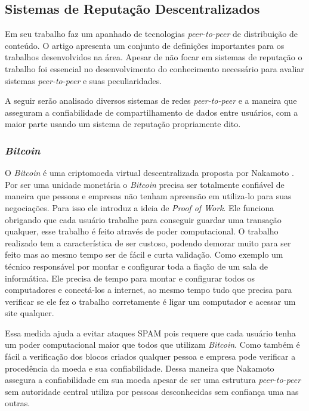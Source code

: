 \documentclass[12pt]{article}
\newcommand{\PtoP} {\textit{peer-to-peer}\xspace}
\begin{document}
\subsection{Sistemas de Reputação Descentralizados} \label{subsec:SRDescen}

Em seu trabalho \cite{10.1145/1041680.1041681} faz um apanhado de tecnologias \PtoP de distribuição de conteúdo. 
O artigo apresenta um conjunto de definições importantes para os trabalhos desenvolvidos na área. 
Apesar de não focar em sistemas de reputação o trabalho foi essencial no desenvolvimento do conhecimento necessário para avaliar sistemas \PtoP e suas peculiaridades.

A seguir serão analisado diversos sistemas de redes \PtoP e a maneira que asseguram a confiabilidade de compartilhamento de dados entre usuários, com a maior parte usando um sistema de reputação propriamente dito.

\subsubsection{\textit{Bitcoin}} \label{subsub:bitcoin}

O \textit{Bitcoin} é uma criptomoeda virtual descentralizada proposta por Nakamoto \cite{nakamoto2008peer}. 
Por ser uma unidade monetária o \textit{Bitcoin} precisa ser totalmente confiável de maneira que pessoas e empresas não tenham apreensão em utiliza-lo para suas negociações.
Para isso ele introduz a ideia de \textit{Proof of Work}.
Ele funciona obrigando que cada usuário trabalhe para conseguir guardar uma transação qualquer, esse trabalho é feito através de poder computacional.
O trabalho realizado tem a característica de ser custoso, podendo demorar muito para ser feito mas ao mesmo tempo ser de fácil e curta validação.
Como exemplo um técnico responsável por montar e configurar toda a fiação de um sala de informática.
Ele precisa de tempo para montar e configurar todos os computadores e conectá-los a internet, ao mesmo tempo tudo que precisa para verificar se ele fez o trabalho corretamente é ligar um computador e acessar um site qualquer.

Essa medida ajuda a evitar ataques SPAM pois requere que cada usuário tenha um poder computacional maior que todos que utilizam \textit{Bitcoin}.
Como também é fácil a verificação dos blocos criados qualquer pessoa e empresa pode verificar a procedência da moeda e sua confiabilidade.
Dessa maneira que Nakamoto assegura a confiabilidade em sua moeda apesar de ser uma estrutura \PtoP sem autoridade central utiliza por pessoas desconhecidas sem confiança uma nas outras.
\end{document}
